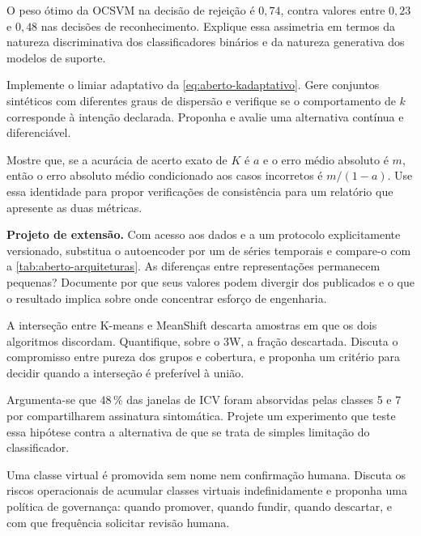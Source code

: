 \begin{exercicios}
\item O peso ótimo da OCSVM na decisão de rejeição é $0{,}74$, contra valores entre
      $0{,}23$ e $0{,}48$ nas decisões de reconhecimento. Explique essa assimetria em
      termos da natureza discriminativa dos classificadores binários e da natureza
      generativa dos modelos de suporte.

\item Implemente o limiar adaptativo da \cref{eq:aberto-kadaptativo}. Gere conjuntos
      sintéticos com diferentes graus de dispersão e verifique se o comportamento de $k$
      corresponde à intenção declarada. Proponha e avalie uma alternativa contínua e
      diferenciável.

\item Mostre que, se a acurácia de acerto exato de $K$ é $a$ e o erro médio absoluto é
      $m$, então o erro absoluto médio condicionado aos casos incorretos é
      $m/(1-a)$. Use essa identidade para propor verificações de consistência para um
      relatório que apresente as duas métricas.

\item \textbf{Projeto de extensão.} Com acesso aos dados e a um protocolo explicitamente
      versionado, substitua o autoencoder por um  de séries temporais e
      compare-o com a \cref{tab:aberto-arquiteturas}. As diferenças entre representações
      permanecem pequenas? Documente por que seus valores podem divergir dos publicados e
      o que o resultado implica sobre onde concentrar esforço de engenharia.

\item A interseção entre K-means e MeanShift descarta amostras em que os dois algoritmos
      discordam. Quantifique, sobre o 3W, a fração descartada. Discuta o compromisso
      entre pureza dos grupos e cobertura, e proponha um critério para decidir quando a
      interseção é preferível à união.

\item Argumenta-se que $48\,\%$ das janelas de ICV foram absorvidas pelas classes 5 e 7
      por compartilharem assinatura sintomática. Projete um experimento que teste essa
      hipótese contra a alternativa de que se trata de simples limitação do
      classificador.

\item Uma classe virtual é promovida sem nome nem confirmação humana. Discuta os riscos
      operacionais de acumular classes virtuais indefinidamente e proponha uma política
      de governança: quando promover, quando fundir, quando descartar, e com que
      frequência solicitar revisão humana.
\end{exercicios}

